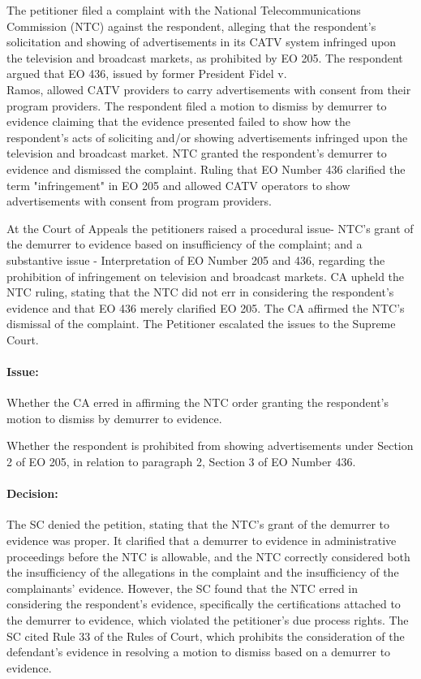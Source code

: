 \documentclass[
12pt,
oneside,
onehalfspacing,
headsepline
]{DigestCollection}
\begin{document}
The petitioner filed a complaint with the National Telecommunications Commission (NTC) against the respondent, alleging that the respondent's solicitation and showing of advertisements in its CATV system infringed upon the television and broadcast markets, as prohibited by EO 205. The respondent argued that EO 436, issued by former President Fidel v. \\Ramos, allowed CATV providers to carry advertisements with consent from their program providers. The respondent filed a motion to dismiss by demurrer to evidence claiming that the evidence presented failed to show how the respondent’s acts of soliciting and/or showing advertisements infringed upon the television and broadcast market. NTC granted the respondent's demurrer to evidence and dismissed the complaint. Ruling that EO Number 436 clarified the term "infringement" in EO 205 and allowed CATV operators to show advertisements with consent from program providers.

At the Court of Appeals the petitioners raised a procedural issue- NTC's grant of the demurrer to evidence based on insufficiency of the complaint; and a substantive issue - Interpretation of EO Number 205 and 436, regarding the prohibition of infringement on television and broadcast markets. CA upheld the NTC ruling, stating that the NTC did not err in considering the respondent's evidence and that EO 436 merely clarified EO 205. The CA affirmed the NTC's dismissal of the complaint. The Petitioner escalated the issues to the Supreme Court.

\paragraph{Issue:}
\label{8858f840-1215-11ef-aa24-9916ea601717}


Whether the CA erred in affirming the NTC order granting the respondent's motion to dismiss by demurrer to evidence.

Whether the respondent is prohibited from showing advertisements under Section 2 of EO 205, in relation to paragraph 2, Section 3 of EO Number 436.

\paragraph{Decision:}
\label{868103f0-1215-11ef-aa24-9916ea601717}


The SC denied the petition, stating that the NTC's grant of the demurrer to evidence was proper. It clarified that a demurrer to evidence in administrative proceedings before the NTC is allowable, and the NTC correctly considered both the insufficiency of the allegations in the complaint and the insufficiency of the complainants' evidence. However, the SC found that the NTC erred in considering the respondent's evidence, specifically the certifications attached to the demurrer to evidence, which violated the petitioner's due process rights. The SC cited Rule 33 of the Rules of Court, which prohibits the consideration of the defendant's evidence in resolving a motion to dismiss based on a demurrer to evidence.
\end{document}
